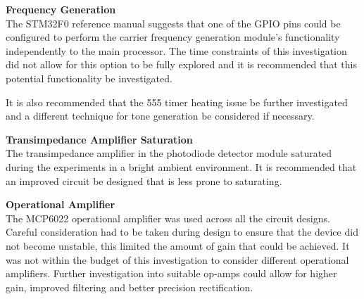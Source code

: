 \textbf{Frequency Generation}\\
The STM32F0 reference manual suggests that one of the GPIO pins could be configured to perform the carrier frequency generation module's functionality independently to the main processor. The time constraints of this investigation did not allow for this option to be fully explored and it is recommended that this potential functionality be investigated.

It is also recommended that the 555 timer heating issue be further investigated and a different technique for tone generation be considered if necessary.

\textbf{Transimpedance Amplifier Saturation}\\
The transimpedance amplifier in the photodiode detector module saturated during the experiments in a bright ambient environment. It is recommended that an improved circuit be designed that is less prone to saturating.

\textbf{Operational Amplifier}\\
The MCP6022 operational amplifier was used across all the circuit designs. Careful consideration had to be taken during design to ensure that the device did not become unstable, this limited the amount of gain that could be achieved. It was not within the budget of this investigation to consider different operational amplifiers. Further investigation into suitable op-amps could allow for higher gain, improved filtering and better precision rectification.


